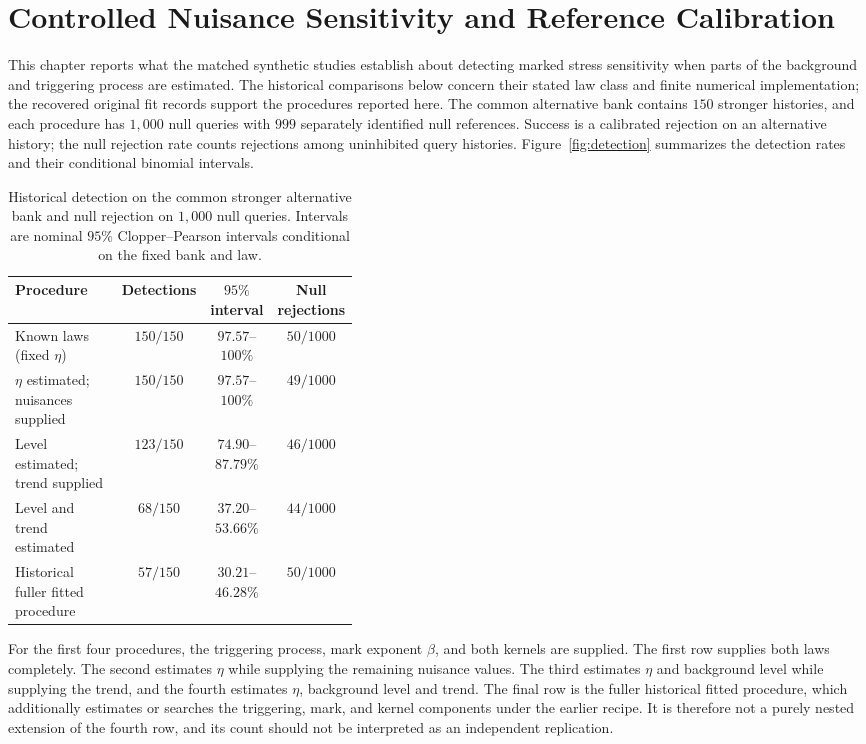 \chapter{Controlled Nuisance Sensitivity and Reference Calibration}\label{chap:synthetic}
\label{ch:synthetic}

This chapter reports what the matched synthetic studies establish about detecting marked stress sensitivity when parts of the background and triggering process are estimated. The historical comparisons below concern their stated law class and finite numerical implementation; the recovered original fit records support the procedures reported here. The common alternative bank contains \(150\) stronger histories, and each procedure has \(1{,}000\) null queries with \(999\) separately identified null references. Success is a calibrated rejection on an alternative history; the null rejection rate counts rejections among uninhibited query histories. Figure~\ref{fig:detection} summarizes the detection rates and their conditional binomial intervals.

\begin{table}[tbp]
\centering
\caption{Historical detection on the common stronger alternative bank and null rejection on \(1{,}000\) null queries. Intervals are nominal \(95\%\) Clopper--Pearson intervals conditional on the fixed bank and law.}
\label{tab:main-detection}
\small
\setlength{\tabcolsep}{4pt}
\begin{tabular}{@{}p{0.40\linewidth}ccc@{}}
\toprule
Procedure & Detections & \(95\%\) interval & Null rejections \\
\midrule
Known laws (fixed \(\eta\)) & \(150/150\) & \(97.57\)--\(100\%\) & \(50/1000\) \\
\(\eta\) estimated; nuisances supplied & \(150/150\) & \(97.57\)--\(100\%\) & \(49/1000\) \\
Level estimated; trend supplied & \(123/150\) & \(74.90\)--\(87.79\%\) & \(46/1000\) \\
Level and trend estimated & \(68/150\) & \(37.20\)--\(53.66\%\) & \(44/1000\) \\
Historical fuller fitted procedure & \(57/150\) & \(30.21\)--\(46.28\%\) & \(50/1000\) \\
\bottomrule
\end{tabular}
\end{table}

For the first four procedures, the triggering process, mark exponent \(\beta\), and both kernels are supplied. The first row supplies both laws completely. The second estimates \(\eta\) while supplying the remaining nuisance values. The third estimates \(\eta\) and background level while supplying the trend, and the fourth estimates \(\eta\), background level and trend. The final row is the fuller historical fitted procedure, which additionally estimates or searches the triggering, mark, and kernel components under the earlier recipe. It is therefore not a purely nested extension of the fourth row, and its count should not be interpreted as an independent replication.

